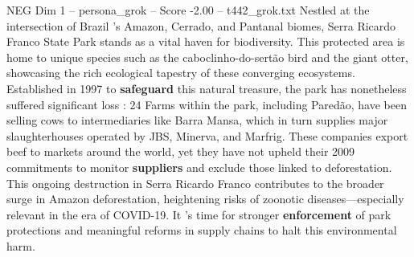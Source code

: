 \begin{textsample}{NEG Dim 1 – persona\_grok – Score -2.00 – t442\_grok.txt}  \label{ex:f1_neg_022}
Nestled at the intersection of Brazil 's Amazon, Cerrado, and Pantanal biomes, Serra Ricardo Franco State Park stands as a vital haven for biodiversity.
This protected area is home to unique species such as the caboclinho-do-sertão bird and the giant otter, showcasing the rich ecological tapestry of these converging ecosystems.
Established in 1997 to \textbf{safeguard} this natural treasure, the park has nonetheless suffered significant loss : 24 %
Farms within the park, including Paredão, have been selling cows to intermediaries like Barra Mansa, which in turn supplies major slaughterhouses operated by JBS, Minerva, and Marfrig.
These companies export beef to markets around the world, yet they have not upheld their 2009 commitments to monitor \textbf{suppliers} and exclude those linked to deforestation.
This ongoing destruction in Serra Ricardo Franco contributes to the broader surge in Amazon deforestation, heightening risks of zoonotic diseases—especially relevant in the era of COVID-19.
It 's time for stronger \textbf{enforcement} of park protections and meaningful reforms in supply chains to halt this environmental harm.

\end{textsample}
